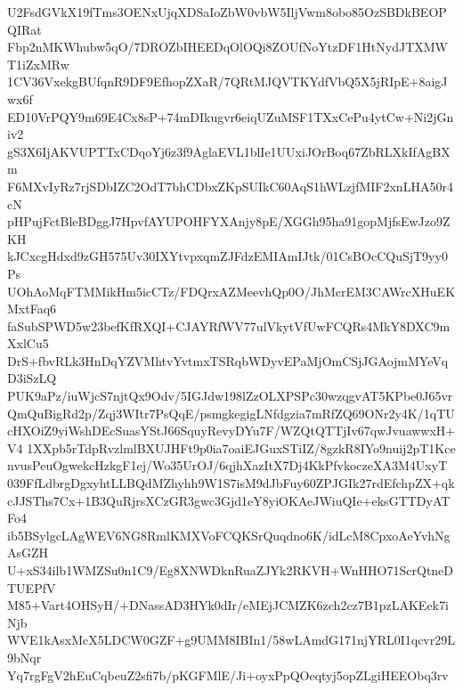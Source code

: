U2FsdGVkX19fTms3OENxUjqXDSaIoZbW0vbW5IljVwm8obo85OzSBDkBEOPQIRat
Fbp2nMKWhubw5qO/7DROZbIHEEDqOlOQi8ZOUfNoYtzDF1HtNydJTXMWT1iZxMRw
1CV36VxekgBUfqnR9DF9EfhopZXaR/7QRtMJQVTKYdfVbQ5X5jRIpE+8aigJwx6f
ED10VrPQY9m69E4Cx8sP+74mDIkugvr6eiqUZuMSF1TXxCePu4ytCw+Ni2jGniv2
gS3X6IjAKVUPTTxCDqoYj6z3f9AglaEVL1blIe1UUxiJOrBoq67ZbRLXkIfAgBXm
F6MXvIyRz7rjSDbIZC2OdT7bhCDbxZKpSUIkC60AqS1hWLzjfMIF2xnLHA50r4cN
pHPujFctBleBDggJ7HpvfAYUPOHFYXAnjy8pE/XGGh95ha91gopMjfsEwJzo9ZKH
kJCxcgHdxd9zGH575Uv30IXYtvpxqmZJFdzEMIAmIJtk/01CsBOcCQuSjT9yy0Ps
UOhAoMqFTMMikHm5icCTz/FDQrxAZMeevhQp0O/JhMcrEM3CAWrcXHuEKMxtFaq6
faSubSPWD5w23befKfRXQI+CJAYRfWV77ulVkytVfUwFCQRs4MkY8DXC9mXxlCu5
DrS+fbvRLk3HnDqYZVMhtvYvtmxTSRqbWDyvEPaMjOmCSjJGAojmMYeVqD3iSzLQ
PUK9aPz/iuWjcS7njtQx9Odv/5IGJdw198lZzOLXPSPc30wzqgvAT5KPbe0J65vr
QmQuBigRd2p/Zqj3WItr7PsQqE/psmgkegigLNfdgzia7mRfZQ69ONr2y4K/1qTU
cHXOiZ9yiWshDEcSuasYStJ66SquyRevyDYu7F/WZQtQTTjIv67qwJvuawwxH+V4
1XXpb5rTdpRvzlmlBXUJHFt9p0ia7oaiEJGuxSTiIZ/8gzkR8IYo9nuij2pT1Kce
nvusPeuOgwekcHzkgF1ej/Wo35UrOJ/6qjhXazItX7Dj4KkPfvkoczeXA3M4UxyT
039FfLdbrgDgxyhtLLBQdMZhyhh9W1S7isM9dJbFuy60ZPJGIk27rdEfchpZX+qk
cJJSThs7Cx+1B3QuRjrsXCzGR3gwc3Gjd1eY8yiOKAeJWiuQIe+eksGTTDyATFo4
ib5BSylgcLAgWEV6NG8RmlKMXVoFCQKSrQuqdno6K/idLcM8CpxoAeYvhNgAsGZH
U+xS34ilb1WMZSu0n1C9/Eg8XNWDknRuaZJYk2RKVH+WnHHO71ScrQtneDTUEPfV
M85+Vart4OHSyH/+DNassAD3HYk0dIr/eMEjJCMZK6zch2cz7B1pzLAKEek7iNjb
WVE1kAsxMcX5LDCW0GZF+g9UMM8IBIn1/58wLAmdG171njYRL0I1qcvr29L9bNqr
Yq7rgFgV2hEuCqbeuZ2sfi7b/pKGFMlE/Ji+oyxPpQOeqtyj5opZLgiHEEObq3rv
